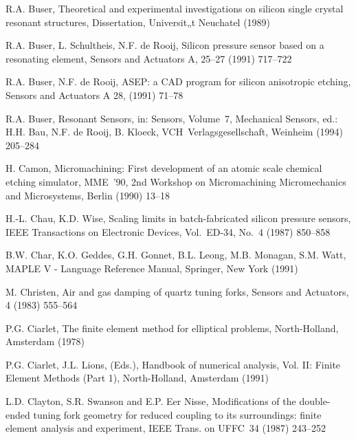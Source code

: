 \begin{thebibliography}{xxx}
 R.A. Buser, Theoretical and experimental investigations on silicon single
 crystal resonant structures, Dissertation, Universit„t Neuchatel (1989)

 R.A. Buser, L. Schultheis, N.F. de Rooij, Silicon pressure sensor based on a
 resonating element, Sensors and Actuators A, 25--27 (1991) 717--722

 R.A. Buser, N.F. de Rooij, {\sf ASEP}: a CAD program for silicon
 anisotropic etching, Sensors and Actuators A 28, (1991) 71--78

 R.A. Buser, Resonant Sensors, in: Sensors, Volume~7, Mechanical Sensors,
 ed.: H.H. Bau, N.F. de Rooij, B. Kloeck, VCH~Verlagsgesellschaft,
 Weinheim (1994) 205--284

 H. Camon, Micromachining: First development of an atomic scale chemical
 etching simulator, MME~'90, 2nd Workshop on Micromachining Micromechanics
 and Microsystems, Berlin (1990) 13--18

 H.-L. Chau, K.D. Wise, Scaling limits in batch-fabricated silicon pressure
 sensors, IEEE Transactions on Electronic Devices, Vol.~ED-34, No.~4
 (1987) 850--858


 B.W. Char, K.O. Geddes, G.H. Gonnet, B.L. Leong, M.B. Monagan, S.M. Watt,
 {\sf MAPLE V} - Language Reference Manual, Springer, New York (1991)

 M. Christen, Air and gas damping of quartz tuning forks, Sensors and
 Actuators, 4 (1983) 555--564

 P.G. Ciarlet, The finite element method for elliptical problems,
 North-Holland, Amsterdam (1978)

 P.G. Ciarlet, J.L. Lions, (Eds.), Handbook of numerical analysis,
 Vol. II: Finite Element Methods (Part 1), North-Holland, Amsterdam (1991)

 L.D. Clayton, S.R. Swanson and E.P. Eer Nisse, Modifications of the
 double-ended tuning fork geometry for reduced coupling to its surroundings:
 finite element analysis and experiment, IEEE Trans. on UFFC~34
 (1987) 243--252


\end{thebibliography}
